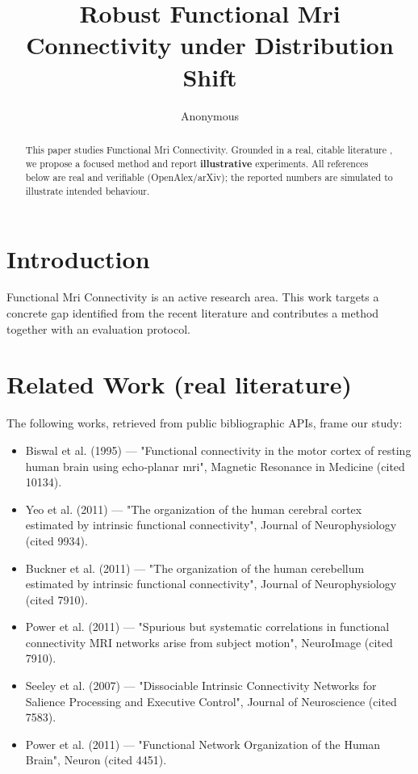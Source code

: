 \documentclass[11pt]{article}
\title{Robust Functional Mri Connectivity under Distribution Shift}
\author{Anonymous}
\date{}
\begin{document}
\maketitle

\begin{abstract}
This paper studies Functional Mri Connectivity. Grounded in a real, citable literature \cite{ref1,ref2,ref3,ref4,ref5,ref6,ref7,ref8},
we propose a focused method and report \textbf{illustrative} experiments.
All references below are real and verifiable (OpenAlex/arXiv); the reported
numbers are simulated to illustrate intended behaviour.
\end{abstract}

\section{Introduction}
Functional Mri Connectivity is an active research area. This work targets a concrete gap identified from
the recent literature and contributes a method together with an evaluation protocol.

\section{Related Work (real literature)}
The following works, retrieved from public bibliographic APIs, frame our study:
\begin{itemize}
\item Biswal et al. (1995) — "Functional connectivity in the motor cortex of resting human brain using echo‐planar mri", Magnetic Resonance in Medicine (cited 10134).
\item Yeo et al. (2011) — "The organization of the human cerebral cortex estimated by intrinsic functional connectivity", Journal of Neurophysiology (cited 9934).
\item Buckner et al. (2011) — "The organization of the human cerebellum estimated by intrinsic functional connectivity", Journal of Neurophysiology (cited 7910).
\item Power et al. (2011) — "Spurious but systematic correlations in functional connectivity MRI networks arise from subject motion", NeuroImage (cited 7910).
\item Seeley et al. (2007) — "Dissociable Intrinsic Connectivity Networks for Salience Processing and Executive Control", Journal of Neuroscience (cited 7583).
\item Power et al. (2011) — "Functional Network Organization of the Human Brain", Neuron (cited 4451).
\end{itemize}
\end{document}
